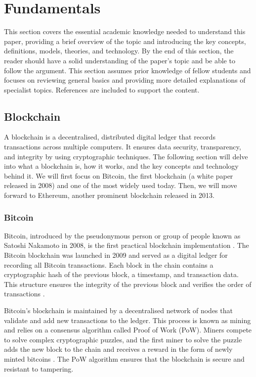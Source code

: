 \chapter{Fundamentals}
This section covers the essential academic knowledge needed to understand this paper, providing a brief overview of the topic and introducing the key concepts, definitions, models, theories, and technology. By the end of this section, the reader should have a solid understanding of the paper's topic and be able to follow the argument. This section assumes prior knowledge of fellow students and focuses on reviewing general basics and providing more detailed explanations of specialist topics. References are included to support the content.

\section{Blockchain}
A blockchain is a decentralised, distributed digital ledger that records transactions across multiple computers. It ensures data security, transparency, and integrity by using cryptographic techniques. The following section will delve into what a blockchain is, how it works, and the key concepts and technology behind it. We will first focus on Bitcoin, the first blockchain (a white paper released in 2008) and one of the most widely used today. Then, we will move forward to Ethereum, another prominent blockchain released in 2013.

\subsection{Bitcoin}
Bitcoin, introduced by the pseudonymous person or group of people known as Satoshi Nakamoto in 2008, is the first practical blockchain implementation \cite{nakamoto2008bitcoin}. The Bitcoin blockchain was launched in 2009 and served as a digital ledger for recording all Bitcoin transactions. Each block in the chain contains a cryptographic hash of the previous block, a timestamp, and transaction data. This structure ensures the integrity of the previous block and verifies the order of transactions \cite{swan2015blockchain}.

Bitcoin's blockchain is maintained by a decentralised network of nodes that validate and add new transactions to the ledger. This process is known as mining and relies on a consensus algorithm called Proof of Work (PoW). Miners compete to solve complex cryptographic puzzles, and the first miner to solve the puzzle adds the new block to the chain and receives a reward in the form of newly minted bitcoins \cite{antonopoulos2014mastering}. The PoW algorithm ensures that the blockchain is secure and resistant to tampering.

